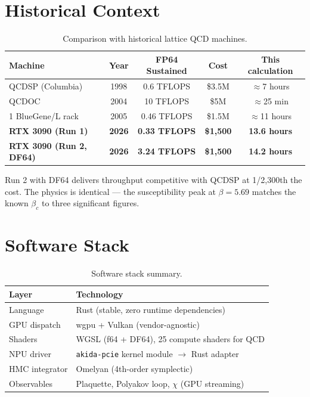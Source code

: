\documentclass[11pt,a4paper]{article}
\newcommand{\btc}{\beta_c}
\begin{document}
\FloatBarrier
\section{Historical Context}

\begin{table}[H]
\centering
\caption{Comparison with historical lattice QCD machines.}
\label{tab:history}
\renewcommand{\arraystretch}{1.25}
\begin{tabular}{lcccc}
\toprule
Machine & Year & FP64 Sustained & Cost & This calculation \\
\midrule
QCDSP (Columbia)         & 1998 & 0.6 TFLOPS & \$3.5M & $\approx$7 hours \\
QCDOC                    & 2004 & 10 TFLOPS  & \$5M   & $\approx$25 min \\
1 BlueGene/L rack        & 2005 & 0.46 TFLOPS & \$1.5M & $\approx$11 hours \\
\textbf{RTX 3090 (Run 1)} & \textbf{2026} & \textbf{0.33 TFLOPS}
  & \textbf{\$1,500} & \textbf{13.6 hours} \\
\textbf{RTX 3090 (Run 2, DF64)} & \textbf{2026} & \textbf{3.24 TFLOPS}
  & \textbf{\$1,500} & \textbf{14.2 hours} \\
\bottomrule
\end{tabular}
\end{table}

Run 2 with DF64 delivers throughput competitive with QCDSP at 1/2,300th the
cost.  The physics is identical --- the susceptibility peak at $\beta = 5.69$
matches the known $\btc$ to three significant figures.

\FloatBarrier
\section{Software Stack}

\begin{table}[H]
\centering
\caption{Software stack summary.}
\label{tab:stack}
\renewcommand{\arraystretch}{1.25}
\begin{tabular}{ll}
\toprule
Layer & Technology \\
\midrule
Language          & Rust (stable, zero runtime dependencies) \\
GPU dispatch      & wgpu + Vulkan (vendor-agnostic) \\
Shaders           & WGSL (f64 + DF64), 25 compute shaders for QCD \\
NPU driver        & \texttt{akida-pcie} kernel module $\to$ Rust adapter \\
HMC integrator    & Omelyan (4th-order symplectic) \\
Observables       & Plaquette, Polyakov loop, $\chi$ (GPU streaming) \\
\bottomrule
\end{tabular}
\end{table}
\end{document}

